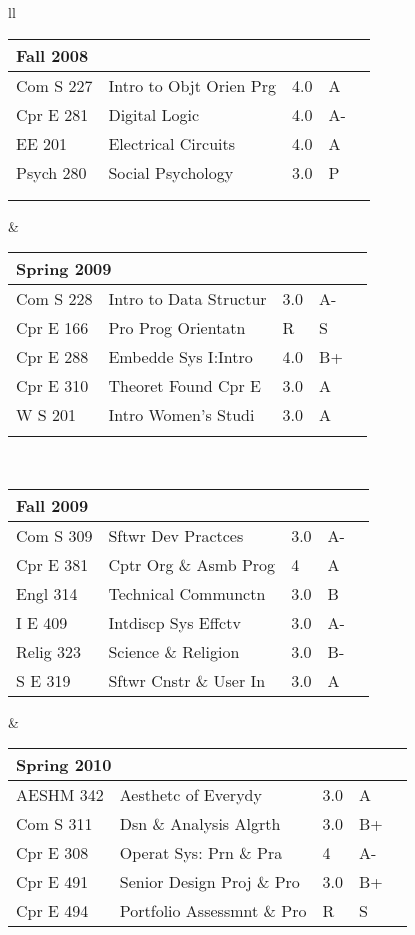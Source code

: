 \documentclass[oneside]{article}
\begin{document}
{\begin{tabular}{ll}
    \begin{tabular}{p{1.5cm} p{3.5cm} p{.3cm} p{.3cm} p{0.75cm}}
      \multicolumn{5}{l}{Fall 2008}\\
      \hline
      Com S 227 & Intro to Objt Orien Prg & 4.0 & A &\\
      Cpr E 281 & Digital Logic & 4.0 & A- &\\
      EE 201 & Electrical Circuits & 4.0 & A &\\
      Psych 280 & Social Psychology & 3.0 & P &\\
      \\
      \\
    \end{tabular}
    &
    \begin{tabular}{p{1.5cm} p{3.5cm} p{.3cm} p{.3cm} p{0.75cm}}
      \multicolumn{5}{l}{Spring 2009}\\
      \hline
      Com S 228 & Intro to Data Structur & 3.0 & A- &\\
      Cpr E 166 & Pro Prog Orientatn & R & S &\\
      Cpr E 288 & Embedde Sys I:Intro & 4.0 & B+ &\\
      Cpr E 310 & Theoret Found Cpr E & 3.0 & A &\\
      W S 201 & Intro Women's Studi & 3.0 & A &\\
      \\
    \end{tabular}
    \\
    \begin{tabular}{p{1.5cm} p{3.5cm} p{.3cm} p{.3cm} p{0.75cm}}
      \multicolumn{5}{l}{Fall 2009}\\
      \hline
      Com S 309 & Sftwr Dev Practces & 3.0 & A- &\\
      Cpr E 381 & Cptr Org \& Asmb Prog & 4 & A &\\
      Engl 314 & Technical Communctn & 3.0 & B &\\
      I E 409 & Intdiscp Sys Effctv & 3.0 & A- &\\
      Relig 323 & Science \& Religion & 3.0 & B- &\\
      S E 319 & Sftwr Cnstr \& User In & 3.0 & A &\\
    \end{tabular}
    &
    \begin{tabular}{p{1.5cm} p{3.5cm} p{.3cm} p{.3cm} p{0.75cm}}
      \multicolumn{5}{l}{Spring 2010}\\
      \hline
      AESHM 342 & Aesthetc of Everydy & 3.0 & A &\\
      Com S 311 & Dsn \& Analysis Algrth & 3.0 & B+ &\\
      Cpr E 308 & Operat Sys: Prn \& Pra & 4 & A- &\\
      Cpr E 491 & Senior Design Proj \& Pro & 3.0 & B+ &\\
      Cpr E 494 & Portfolio Assessmnt \& Pro & R & S &\\
    \end{tabular}
    \\
  

\end{tabular}}
\end{document}
